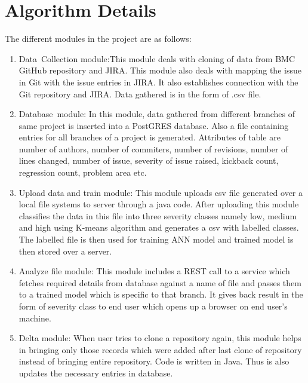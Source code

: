 \documentclass[oneside,a4paper,12pt]{book}
\begin{document}
\section{Algorithm Details}

The different modules in the project are as follows:\par

\setlength{\parskip}{0.0pt}
\begin{enumerate}
	\item Data\ Collection module:This module deals with cloning of data from BMC GitHub repository and JIRA. This module also deals with mapping the issue in Git with the issue entries in JIRA.  It also establishes connection with the Git repository and JIRA. Data gathered is in the form of .csv file.\par

	\item Database\ module: In this module, data gathered from different branches of  same project is inserted into a PostGRES database. Also a file containing entries for all branches of a project is generated. Attributes of table are number of authors, number of commiters, number of revisions, number of lines changed, number of issue, severity of issue raised, kickback count, regression count, problem area etc.\par

	\item Upload data and train module: This module uploads csv file generated over a local file systems to server through a java code. After uploading this module classifies the data in this file into three severity classes namely low, medium and high using K-means algorithm and generates a csv with labelled classes. The labelled file is then used for training ANN model and trained model is then stored over a server.\par

	\item Analyze file module: This module includes a REST call to a service which fetches required details from database against a name of file and passes them to a trained model which is specific to that branch. It gives back result in the form of severity class to end user which opens up a browser on end user’s machine.\par

	\item Delta module: When user tries to clone a repository again, this module helps in bringing only those records which were added after last clone of repository instead of bringing entire repository. Code is written in Java. Thus is also updates the necessary entries in database.
\end{enumerate}\par
\end{document}
